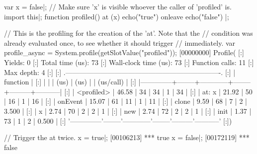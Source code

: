 \begin{urbiscript}
var x = false|;
// Make sure 'x' is visible whoever the caller of 'profiled' is.
import this|;
function profiled()
{
  at (x)
    echo("true")
  onleave
    echo("false")
}|;

// This is the profiling for the creation of the 'at'. Note that the
// condition was already evaluated once, to see whether it should trigger
// immediately.
var profile_async = System.profile(getSlotValue("profiled"));
[00000000] Profile(
[:]  Yields:                    0
[:]  Total time (us):          73
[:]  Wall-clock time (us):     73
[:]  Function calls:           11
[:]  Max depth:                 4
[:]
[:]  .-------------------------------------------------------------------.
[:]  |   function   |   %
[:]  |              |        |    (us)    |  (us)  |         | (us/call) |
[:]  |--------------+--------+------------+--------+---------+-----------|
[:]  |   <profiled> |  46.58 |         34 |     34 |       1 |        34 |
[:]  |    at: { x } |  21.92 |         50 |     16 |       1 |        16 |
[:]  |      onEvent |  15.07 |         61 |     11 |       1 |        11 |
[:]  |        clone |   9.59 |         68 |      7 |       2 |     3.500 |
[:]  |            x |   2.74 |         70 |      2 |       2 |         1 |
[:]  |          new |   2.74 |         72 |      2 |       2 |         1 |
[:]  |         init |   1.37 |         73 |      1 |       2 |     0.500 |
[:]  '--------------'--------'------------'--------'---------'-----------'
[:])

// Trigger the at twice.
x = true|;
[00106213] *** true
x = false|;
[00172119] *** false


\end{urbiscript}
